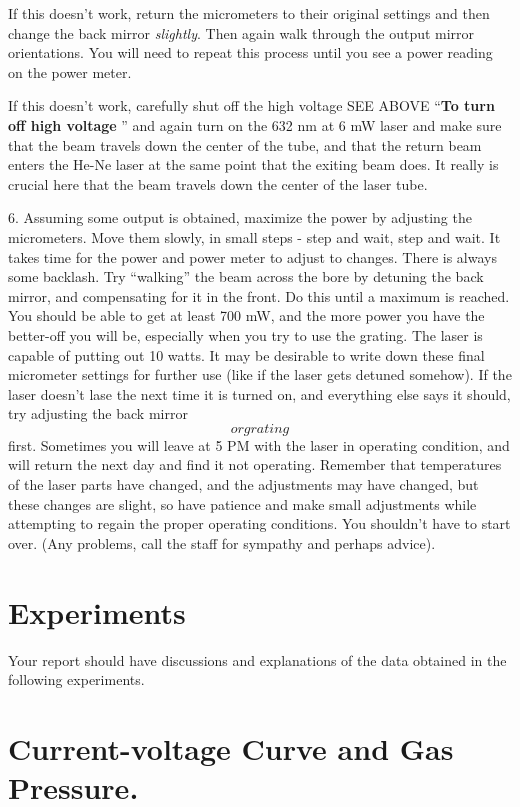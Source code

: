 \documentclass{../lab}
\begin{document}
If this doesn't work, return the micrometers to their original settings and then change the back mirror \emph{slightly}. Then again walk through the output mirror orientations. You will need to repeat this process until you see a power reading on the power meter.

If this doesn't work, carefully shut off the high voltage SEE ABOVE ``\textbf{To turn off high voltage} '' and again turn on the 632 nm at 6 mW laser and make sure that the beam travels down the center of the tube, and that the return beam enters the He-Ne laser at the same point that the exiting beam does. It really is crucial here that the beam travels down the center of the laser tube.

6. Assuming some output is obtained, maximize the power by adjusting the micrometers. Move them slowly, in small steps - step and wait, step and wait. It takes time for the power and power meter to adjust to changes. There is always some backlash. Try ``walking'' the beam across the bore by detuning the back mirror, and compensating for it in the front. Do this until a maximum is reached. You should be able to get at least 700 mW, and the more power you have the better-off you will be, especially when you try to use the grating. The laser is capable of putting out 10 watts. It may be desirable to write down these final micrometer settings for further use (like if the laser gets detuned somehow). If the laser doesn't lase the next time it is turned on, and everything else says it should, try adjusting the back mirror \[or grating\] first. Sometimes you will leave at 5 PM with the laser in operating condition, and will return the next day and find it not operating. Remember that temperatures of the laser parts have changed, and the adjustments may have changed, but these changes are slight, so have patience and make small adjustments while attempting to regain the proper operating conditions. You shouldn't have to start over. (Any problems, call the staff for sympathy and perhaps advice).

\section{Experiments}

Your report should have discussions and explanations of the data obtained in the following experiments.

\section{Current-voltage Curve and Gas Pressure.}
\end{document}
